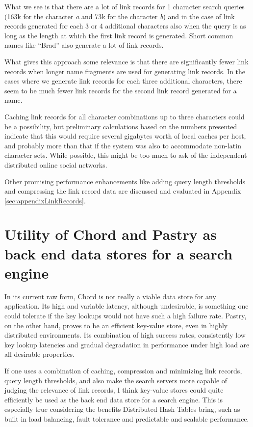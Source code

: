 What we see is that there are a lot of link records for 1 character search queries (163k for the character \emph{a} and 73k for the character \emph{b}) and in the case of link records generated for each 3 or 4 additional characters also when the query is as long as the length at which the first link record is generated. Short common names like ``Brad'' also generate a lot of link records.

What gives this approach some relevance is that there are significantly fewer link records when longer name fragments are used for generating link records. In the cases where we generate link records for each three additional characters, there seem to be much fewer link records for the second link record generated for a name.

Caching link records for all character combinations up to three characters could be a possibility, but preliminary calculations based on the numbers presented indicate that this would require several gigabytes worth of local caches per host, and probably more than that if the system was also to accommodate non-latin character sets. While possible, this might be too much to ask of the independent distributed online social networks.

Other promising performance enhancements like adding query length thresholds and compressing the link record data are discussed and evaluated in Appendix \ref{sec:appendixLinkRecords}.

\section{Utility of Chord and Pastry as back end data stores for a search engine}
In its current raw form, Chord is not really a viable data store for any application. Its high and variable latency, although undesirable, is something one could tolerate if the key lookups would not have such a high failure rate.
Pastry, on the other hand, proves to be an efficient key-value store, even in highly distributed environments. Its combination of high success rates, consistently low key lookup latencies and gradual degradation in performance under high load are all desirable properties.

If one uses a combination of caching, compression and minimizing link records, query length thresholds, and also make the search servers more capable of judging the relevance of link records, I think key-value stores could quite efficiently be used as the back end data store for a search engine. This is especially true considering the benefits Distributed Hash Tables bring, such as built in load balancing, fault tolerance and predictable and scalable performance.

